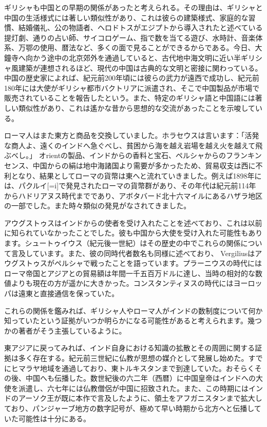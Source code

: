 \documentclass[a4paper,11pt,openany]{ltjsbook}
\begin{document}
ギリシャも中国との早期の関係があったと考えられる。その理由は、ギリシャと中国の生活様式には著しい類似性があり、これは彼らの建築様式、家庭的な習慣、結婚儀礼、公の物語者、ヘロドトスがエジプトから導入されたと述べている提灯劇、通りの占い師、サイコロゲーム、指で数を当てる遊び、水時計、音楽体系、万鄂の使用、暦法など、多くの面で見ることができるからである。今日、大鐘寺へ向かう途中の北京郊外を通過していると、古代地中海文明に近い半ギリシャ風建築が連想されるほど、現代の中国は古典的な文明と密接に関わっている。中国の歴史家によれば、紀元前200年頃には彼らの武力が遠西で成功し、紀元前180年には大使がギリシャ都市バクトリアに派遣され、そこで中国製品が市場で販売されていることを報告したという。また、特定のギリシャ語と中国語には著しい類似性があり、これは遙かな昔から思想的な交流があったことを示唆している。

ローマ人はまた東方と商品を交換していました。ホラセウスは言います：「活発な商人よ、遠くのインドへ急ぐべし、貧困から海を越え岩場を越え火を越えて飛ぶべし。」 オrientの製品、インドからの香料と宝石、ペルシャからのフランキンセンス、中国からの絹は地中海諸国より需要が多かったため、貿易収支は西に不利となり、結果としてローマの貨幣は東へと流れていきました。例えば1898年には、パクルイ[=i]で発見されたローマの貨幣群があり、その年代は紀元前114年からハドリアヌス時代までであり、アボタバード北十六マイルにあるハザラ地区の一部でした。また時々類似の発見がなされてきました。

アウグストゥスはインドからの使者を受け入れたことを述べており、これは以前に知られていなかったことでした。彼も中国から大使を受け入れた可能性もあります。シュートゥイウス（紀元後一世紀）はその歴史の中でこれらの関係について言及しています。また、彼の同時代者数名も同様に述べており、 Vergiliusはアウグストゥスがペルシャで戦ったことを語っています。プラーニウスの時代にはローマ帝国とアジアとの貿易額は年間一千五百万ドルに達し、当時の相対的な数値よりも現在の方が遥かに大きかった。コンスタンティヌスの時代にはヨーロッパは遠東と直接通信を保っていた。

これらの関係を鑑みれば、ギリシャ人やローマ人がインドの数制度について何か知っていたという証拠がいつか明らかになる可能性があると考えられます。幾つかの著者がそう主張しているように。

東アジアに戻ってみれば、インド自身における知識の拡散とその周囲に関する証拠は多く存在する。紀元前三世紀に仏教が思想の媒介として発展し始めた。すでにヒマラヤ地域を通過しており、東トルキスタンまで到達していた。おそらくその後、中国へも伝播した。数世紀後の六二年（西暦）に中国皇帝はインドへの大使を派遣し、六七年には仏教僧侶が中国に招致された。また、この時期にはインドのアーソク王が既に本作で言及したように、領土をアフガニスタンまで拡大しており、パンジャーブ地方の数字記号が、極めて早い時期から北方へと伝播していた可能性は十分にある。
\end{document}
